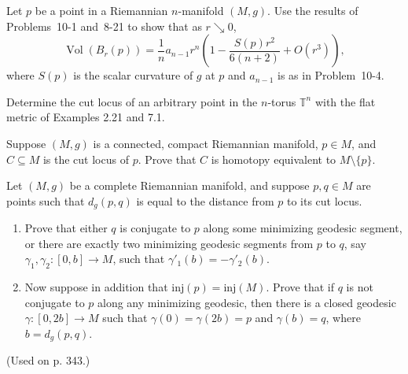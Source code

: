 \begin{exercise}
\label{prob:asymptotic-volume-geodesic-balls}

Let $p$ be a point in a Riemannian $n$-manifold $(M,g)$. Use the results of Problems~10-1 and~8-21 to show that as $r \searrow 0$,
\[
\operatorname{Vol}(B_r(p)) = \frac{1}{n} a_{n-1} r^n \left( 1 - \frac{S(p) r^2}{6(n+2)} + O(r^3) \right),
\]
where $S(p)$ is the scalar curvature of $g$ at $p$ and $a_{n-1}$ is as in Problem~10-4.
\end{exercise}

\begin{exercise}\label{prob:cut-locus-flat-torus}
Determine the cut locus of an arbitrary point in the $n$-torus $\mathbb{T}^n$ with the flat metric of Examples 2.21 and 7.1.
\end{exercise}

\begin{exercise}\label{prob:cut-locus-homotopy-equivalence}
Suppose $(M,g)$ is a connected, compact Riemannian manifold, $p \in M$, and $C \subseteq M$ is the cut locus of $p$. Prove that $C$ is homotopy equivalent to $M \setminus \{p\}$.
\end{exercise}

\begin{exercise}\label{prob:distance-cut-locus}
Let $(M,g)$ be a complete Riemannian manifold, and suppose $p,q \in M$ are points such that $d_g(p,q)$ is equal to the distance from $p$ to its cut locus.

\begin{enumerate}
\item[(a)] Prove that either $q$ is conjugate to $p$ along some minimizing geodesic segment, or there are exactly two minimizing geodesic segments from $p$ to $q$, say $\gamma_1, \gamma_2: [0,b] \to M$, such that $\gamma'_1(b) = -\gamma'_2(b)$.

\item[(b)] Now suppose in addition that $\text{inj}(p) = \text{inj}(M)$. Prove that if $q$ is not conjugate to $p$ along any minimizing geodesic, then there is a closed geodesic $\gamma: [0,2b] \to M$ such that $\gamma(0) = \gamma(2b) = p$ and $\gamma(b) = q$, where $b = d_g(p,q)$.
\end{enumerate}

(Used on p. 343.)
\end{exercise}

